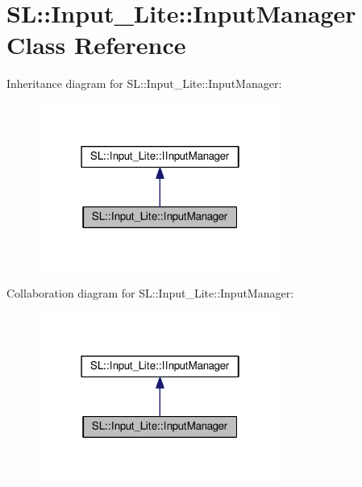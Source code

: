 \hypertarget{class_s_l_1_1_input___lite_1_1_input_manager}{}\section{SL\+:\+:Input\+\_\+\+Lite\+:\+:Input\+Manager Class Reference}
\label{class_s_l_1_1_input___lite_1_1_input_manager}


Inheritance diagram for SL\+:\+:Input\+\_\+\+Lite\+:\+:Input\+Manager\+:
\nopagebreak
\begin{figure}[H]
\begin{center}
\leavevmode
\includegraphics[width=226pt]{class_s_l_1_1_input___lite_1_1_input_manager__inherit__graph}
\end{center}
\end{figure}


Collaboration diagram for SL\+:\+:Input\+\_\+\+Lite\+:\+:Input\+Manager\+:
\nopagebreak
\begin{figure}[H]
\begin{center}
\leavevmode
\includegraphics[width=226pt]{class_s_l_1_1_input___lite_1_1_input_manager__coll__graph}
\end{center}
\end{figure}

